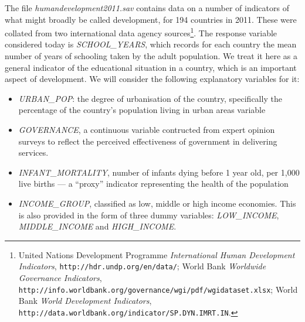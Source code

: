 \vspace*{-2ex}
The file \emph{humandevelopment2011.sav} contains data on a number of indicators of
what might broadly be called development, for 194 countries in 2011. These were collated
from two international data agency sources\footnote{United Nations Development
Programme \emph{International Human Development Indicators},
\texttt{http://hdr.undp.org/en/data/};
World Bank \emph{Worldwide Governance Indicators},
\texttt{http://info.worldbank.org/governance/wgi/pdf/wgidataset.xlsx};
World Bank \emph{World Development Indicators},
\texttt{http://data.worldbank.org/indicator/SP.DYN.IMRT.IN}.
}.
The response
variable considered today is \emph{SCHOOL\_YEARS}, which records for each
country the mean number of years of schooling taken by the adult population.
We treat it here as a general indicator
of the educational situation in a country, which is an important aspect of development.
We will consider the following
explanatory variables for it:
\begin{itemize}
\vspace*{-2EX}
\item
\emph{URBAN\_POP}: the degree of urbanisation of the country, specifically the
percentage of the country's population living in urban areas
variable
\item
\emph{GOVERNANCE}, a continuous variable contructed from expert opinion surveys to reflect the
perceived effectiveness of government in delivering services.
\item
\emph{INFANT\_MORTALITY}, number of infants dying before 1 year old, per
1,000 live births --- a
``proxy'' indicator representing the health of the population
\item
\emph{INCOME\_GROUP}, classified as low, middle or high income
economies.
This is also provided in the form of three dummy variables: \emph{LOW\_INCOME},
 \emph{MIDDLE\_INCOME} and \emph{HIGH\_INCOME}.
\end{itemize}

